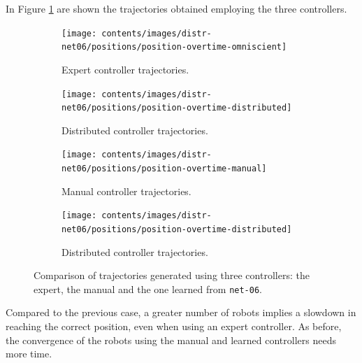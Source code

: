 In Figure \ref{fig:net06traj} are shown the trajectories obtained employing 
the 
three controllers. 
\begin{figure}[!htb]
	\begin{center}
		\begin{subfigure}[h]{0.49\textwidth}
			\centering
			\texttt{[image: contents/images/distr-net06/positions/position-overtime-omniscient]}%
			\caption{Expert controller trajectories.}
		\end{subfigure}
		\hfill
		\begin{subfigure}[h]{0.49\textwidth}
			\centering
			\texttt{[image: contents/images/distr-net06/positions/position-overtime-distributed]}
			\caption{Distributed controller trajectories.}
		\end{subfigure}
	\end{center}
	\hspace*{\fill}%
	
	\vspace*{8pt}%
	
	\hspace*{\fill}%
	\begin{subfigure}[h]{0.49\textwidth}
		\centering			
		\texttt{[image: contents/images/distr-net06/positions/position-overtime-manual]}%
		\caption{Manual controller trajectories.}
	\end{subfigure}
	\hfill
	\begin{subfigure}[h]{0.49\textwidth}
		\centering
		\texttt{[image: contents/images/distr-net06/positions/position-overtime-distributed]}
		\caption{Distributed controller trajectories.}
	\end{subfigure}
	\caption[]{Comparison 
		of trajectories generated using three controllers: the expert, the manual 
		and the one learned from \texttt{net-06}.}
	\label{fig:net06traj}
\end{figure}
Compared to the previous case, a greater number of robots implies a 
slowdown in reaching the correct position, even when using an expert 
controller.
As before, the convergence of the robots using the manual and learned 
controllers needs more time.

